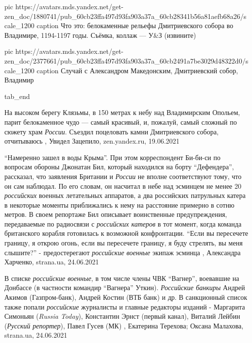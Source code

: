      pic https://avatars.mds.yandex.net/get-zen_doc/1880741/pub_60cb23ffa497d93fa903a37a_60cb28341b56a81aefb68a26/scale_1200
     caption Что это: белокаменные рельефы Дмитриевского собора во Владимире, 1194-1197 годы. Съёмка, коллаж — У\&З (извините)

     pic https://avatars.mds.yandex.net/get-zen_doc/2377661/pub_60cb23ffa497d93fa903a37a_60cb2491a7be3029d48322d0/scale_1200
     caption Случай с Александром Македонским, Дмитриевский собор, Владимир

  tab_end
\fi

На высоком берегу Клязьмы, в 150 метрах к небу над Владимирским Опольем, парит
белокаменное чудо — самый красивый, и, пожалуй, самый сложный по сюжету храм
\emph{России}.  Съездил поцеловать камни Дмитриевского собора, отчитываюсь
, 
Увидел Зацепило, zen.yandex.ru, 19.06.2021

\enquote{Намеренно зашел в воды Крыма}.
При этом корреспондент Би-би-си по вопросам обороны Джонатан Бил, который
находился на борту \enquote{Дефендера}, рассказал, что заявления Британии и \emph{России} не
вполне соответствуют тому, что он сам наблюдал.  По его словам, он насчитал в
небе над эсминцем не менее 20 \emph{российских} военных летательных аппаратов, а два
российских патрульных катера в некоторые моменты приближались к нему на
расстояние примерно в сотню метров.  В своем репортаже Бил описывает
воинственные предупреждения, передаваемые по радиосвязи с \emph{российских катеров} в
тот момент, когда команда британского корабля готовилась к возможной
конфронтации.  \enquote{Если вы пересечете границу, я открою огонь, если вы пересечете
границу, я буду стрелять, вы меня слышите?} - предостерегают \emph{российские военные}
экипаж эсминца
, Александра Харченко, strana.ua, 24.06.2021

В списке \emph{российские военные}, в том числе члены ЧВК \enquote{Вагнер}, воевавшие на
Донбассе (в частности командир \enquote{Вагнера} Уткин). \emph{Российские банкиры} Андрей
Акимов (Газпром-банк), Андрей Костин (ВТБ банк) и др.  В санкционный список
также попали \emph{российские} журналисты и главные редакторы изданий - Маргарита
Симоньян (\emph{Russia Today}), Константин Эрнст (первый канал), Виталий Лейбин
(\emph{Русский репортер}), Павел Гусев (МК)
, Екатерина Терехова; Оксана Малахова, 
strana.ua, 24.06.2021

